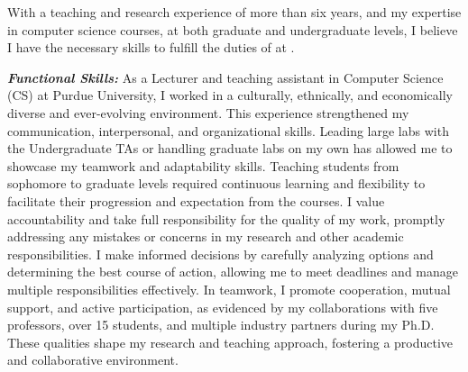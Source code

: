 \documentclass[9pt]{article}
\renewcommand*\paragraph[1]{}
\begin{document}
\paragraph{2 and 3) Demonstrated ability to teach and interact with both undergraduate and graduate students}
With a teaching and research 
experience of more than six years, and my expertise in computer science courses, at both graduate and undergraduate levels, I believe I have the necessary skills to fulfill the duties of  \PositionName{} at \InstitutionName.

\textbf{\textit{Functional Skills: }}
As a Lecturer and teaching assistant in Computer Science (CS) at Purdue University, I worked in a culturally, ethnically, and economically diverse and ever-evolving environment. This experience strengthened my communication, interpersonal, and organizational skills. Leading large labs with the Undergraduate TAs or handling graduate labs on my own has allowed me to showcase my teamwork and adaptability skills. Teaching students from sophomore to graduate levels required continuous learning and flexibility to facilitate their progression and expectation from the courses. 
I value accountability and take full responsibility for the quality of my work, promptly addressing any mistakes or concerns in my research and other academic responsibilities. I make informed decisions by carefully analyzing options and determining the best course of action, allowing me to meet deadlines and manage multiple responsibilities effectively. In teamwork, I promote cooperation, mutual support, and active participation, as evidenced by my collaborations with five professors, over 15 students, and multiple industry partners during my Ph.D. These qualities shape my research and teaching approach, fostering a productive and collaborative environment. 
\end{document}
